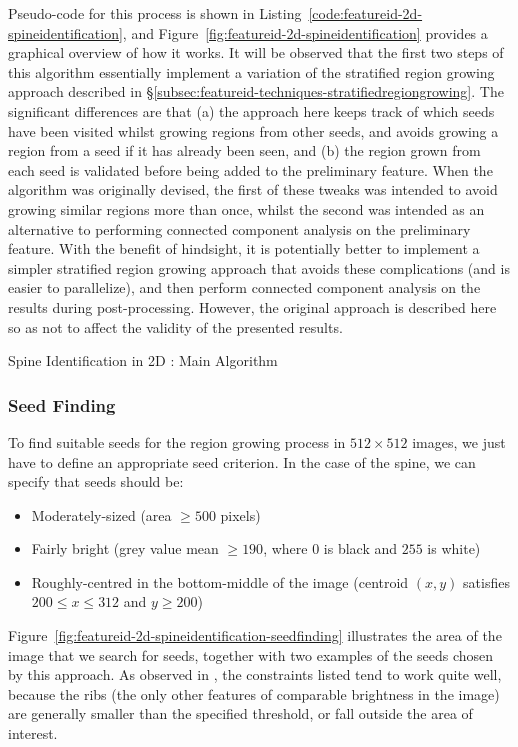 \noindent Pseudo-code for this process is shown in Listing~\ref{code:featureid-2d-spineidentification}, and Figure~\ref{fig:featureid-2d-spineidentification} provides a graphical overview of how it works. It will be observed that the first two steps of this algorithm essentially implement a variation of the stratified region growing approach described in \S\ref{subsec:featureid-techniques-stratifiedregiongrowing}. The significant differences are that (a) the approach here keeps track of which seeds have been visited whilst growing regions from other seeds, and avoids growing a region from a seed if it has already been seen, and (b) the region grown from each seed is validated before being added to the preliminary feature. When the algorithm was originally devised, the first of these tweaks was intended to avoid growing similar regions more than once, whilst the second was intended as an alternative to performing connected component analysis on the preliminary feature. With the benefit of hindsight, it is potentially better to implement a simpler stratified region growing approach that avoids these complications (and is easier to parallelize), and then perform connected component analysis on the results during post-processing. However, the original approach is described here so as not to affect the validity of the presented results.

\begin{stulisting}[p]
\caption{Spine Identification in 2D : Main Algorithm}
\label{code:featureid-2d-spineidentification}

\end{stulisting}

\subsubsection{Seed Finding}

To find suitable seeds for the region growing process in $512 \times 512$ images, we just have to define an appropriate seed criterion. In the case of the spine, we can specify that seeds should be:
%
\begin{itemize}

\item Moderately-sized (area $\ge 500$ pixels)
\item Fairly bright (grey value mean $\ge 190$, where $0$ is black and $255$ is white)
\item Roughly-centred in the bottom-middle of the image (centroid $(x,y)$ satisfies $200 \le x \le 312$ and $y \ge 200$)

\end{itemize}
%
Figure~\ref{fig:featureid-2d-spineidentification-seedfinding} illustrates the area of the image that we search for seeds, together with two examples of the seeds chosen by this approach. As observed in \cite{gvcispa09}, the constraints listed tend to work quite well, because the ribs (the only other features of comparable brightness in the image) are generally smaller than the specified threshold, or fall outside the area of interest.

